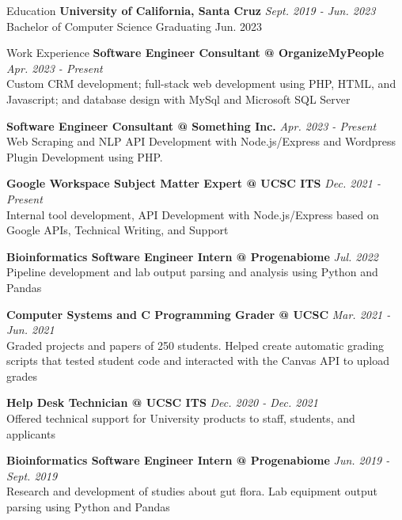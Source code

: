 \documentclass{resume} %
\begin{document}
\begin{rSection}{Education}
    {\bf{University of California, Santa Cruz}}
    \hfill{\em Sept. 2019 - Jun. 2023}
    \\ Bachelor of Computer Science \hfill{ Graduating Jun. 2023 }
\end{rSection}

\begin{rSection}{Work Experience}
    {\bf{Software Engineer Consultant} @ OrganizeMyPeople}
    \hfill{\em Apr. 2023 - Present}
    \\ Custom CRM development; full-stack web development using PHP, HTML, and Javascript; and database design with MySql and Microsoft SQL Server 

    {\bf{Software Engineer Consultant} @  Something Inc.}
    \hfill{\em Apr. 2023 - Present}
    \\ Web Scraping and NLP API Development with Node.js/Express and Wordpress Plugin Development using PHP.

    {\bf{Google Workspace Subject Matter Expert} @ UCSC ITS }
    \hfill{\em Dec. 2021 - Present}
    \\ Internal tool development, API Development with Node.js/Express based on Google APIs, Technical Writing, and Support

    {\bf{Bioinformatics Software Engineer Intern} @ Progenabiome}
    \hfill{\em Jul. 2022}
    \\Pipeline development and lab output parsing and analysis using Python and Pandas


    {\bf{Computer Systems and C Programming Grader} @ UCSC}
    \hfill{\em Mar. 2021 - Jun. 2021}
    \\ Graded projects and papers of 250 students. Helped create automatic grading scripts that tested student code and interacted with the Canvas API to upload grades

    {\bf{Help Desk Technician} @ UCSC ITS}
    \hfill{\em Dec. 2020 - Dec. 2021}
    \\ Offered technical support for University products to staff, students, and applicants

    {\bf{Bioinformatics Software Engineer Intern} @ Progenabiome}
    \hfill{\em Jun. 2019 - Sept. 2019}
    \\ Research and development of studies about gut flora. Lab equipment output parsing using Python and Pandas
\end{rSection}
\end{document}
